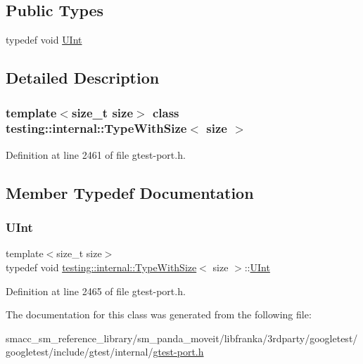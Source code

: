 \subsection*{Public Types}
\begin{DoxyCompactItemize}
\item 
typedef void \hyperlink{classtesting_1_1internal_1_1TypeWithSize_a3898640d9f6c1e18110eef90f47a5d7b}{U\+Int}
\end{DoxyCompactItemize}


\subsection{Detailed Description}
\subsubsection*{template$<$size\+\_\+t size$>$\newline
class testing\+::internal\+::\+Type\+With\+Size$<$ size $>$}



Definition at line 2461 of file gtest-\/port.\+h.



\subsection{Member Typedef Documentation}
\mbox{\label{classtesting_1_1internal_1_1TypeWithSize_a3898640d9f6c1e18110eef90f47a5d7b}} 
\subsubsection{\texorpdfstring{U\+Int}{UInt}}
{\footnotesize\ttfamily template$<$size\+\_\+t size$>$ \\
typedef void \hyperlink{classtesting_1_1internal_1_1TypeWithSize}{testing\+::internal\+::\+Type\+With\+Size}$<$ size $>$\+::\hyperlink{classtesting_1_1internal_1_1TypeWithSize_a3898640d9f6c1e18110eef90f47a5d7b}{U\+Int}}



Definition at line 2465 of file gtest-\/port.\+h.



The documentation for this class was generated from the following file\+:\begin{DoxyCompactItemize}
\item 
smacc\+\_\+sm\+\_\+reference\+\_\+library/sm\+\_\+panda\+\_\+moveit/libfranka/3rdparty/googletest/googletest/include/gtest/internal/\hyperlink{gtest-port_8h}{gtest-\/port.\+h}\end{DoxyCompactItemize}
